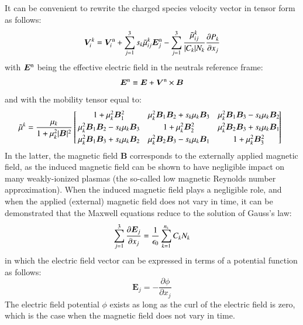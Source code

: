 \documentclass[twoside,onecolumn,10pt]{waflarticle}
\renewcommand{\vec}[1]{\bm{#1}}
\newcommand{\alb}{\vspace{0.1cm}\\} %
\newcommand{\mfd}{\displaystyle}
\newcommand{\ns}{{n_{\rm s}}}
\newcommand{\nd}{3}
\renewcommand{\vec}[1]{\bm{ #1 }}
\begin{document}
It can be convenient to rewrite the  charged species velocity vector in tensor form as follows:
%
\begin{equation}
  \vec{V}^{k}_i = \vec{V}^{\rm n}_i+\sum_{j=1}^\nd s_k \wtilde{\mu}^k_{ij}  \vec{E}_j^{\rm n}
             - \sum_{j=1}^\nd  \frac{\wtilde{\mu}^{k}_{ij}}{|C_k| N_k} \frac{\partial P_k}{\partial x_j}
  \label{eqn:V}
\end{equation}
%
with $\vec{E}^{\rm n}$ being the effective electric field in the neutrals reference frame:
%
\begin{equation}
\vec{E}^{\rm n} \equiv \vec{E}+\vec{V}^{\rm n} \times \vec{B}
\label{eqn:En}
\end{equation}
%
and with the mobility tensor equal to:
%
\begin{equation}
\!\!\!
\begin{array}{l}\mfd
\wtilde{\mu}^k  =\frac{\mu_k}{1+\mu_k^2|\vec{B}|^2}\left[\!\!\begin{array}{ccc} 
      1+\mu_k^2 \vec{B}_1^2 
     & \mu_k^2\vec{B}_1\vec{B}_2+s_k \mu_k \vec{B}_3  
     & \mu_k^2\vec{B}_1\vec{B}_3-s_k \mu_k \vec{B}_2 \alb
      \mu_k^2\vec{B}_1\vec{B}_2-s_k\mu_k\vec{B}_3 & 1+\mu_k^2\vec{B}_2^2 &  \mu_k^2\vec{B}_2\vec{B}_3+s_k\mu_k\vec{B}_1  \alb
      \mu_k^2\vec{B}_1\vec{B}_3 +s_k\mu_k\vec{B}_2 & \mu_k^2 \vec{B}_2\vec{B}_3-s_k\mu_k\vec{B}_1  & 1+\mu_k^2\vec{B}_3^2 
    \end{array} \!\!\!\!\right]
\end{array}
\label{eqn:mutilde}
\end{equation}
%
In the latter, the magnetic field $\vec{B}$ corresponds to the externally applied magnetic field, as the induced magnetic field can be shown to have negligible impact on many weakly-ionized plasmas (the so-called low magnetic Reynolds number approximation). When the induced magnetic field plays a negligible role, and when the applied (external) magnetic field does not vary in time, it can be demonstrated that the Maxwell equations reduce to the solution of Gauss's law:
%
\begin{equation}
\sum_{j=1}^3 \frac{\partial \vec{E}_j}{\partial x_j}=\frac{1}{\epsilon_0} \sum_{k=1}^\ns C_k N_k 
\label{eqn:gauss}
\end{equation}
%
in which the electric field vector can be expressed in terms of a potential function as follows:  
%
\begin{equation}
  \vec{E}_j=-\frac{\partial \phi}{\partial x_j}
  \label{eqn:potential}
\end{equation}
%
The electric field potential $\phi$ exists as long as the curl of the electric field is zero, which is the case when the magnetic field does not vary in time.  
\end{document}
